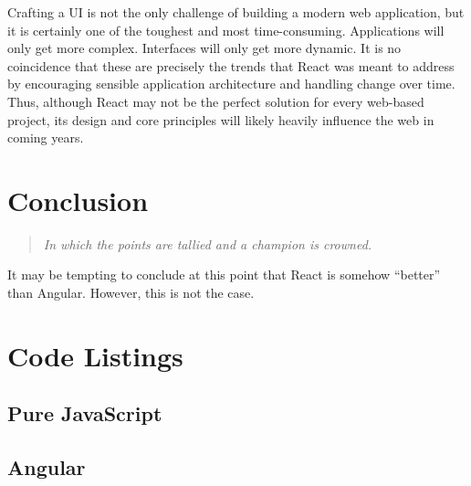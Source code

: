 \documentclass[12pt,letterpaper]{article}
\begin{document}
Crafting a UI is not the only challenge of building a modern web application, but it is certainly one of the toughest and most time-consuming. Applications will only get more complex. Interfaces will only get more dynamic. It is no coincidence that these are precisely the trends that React was meant to address by encouraging sensible application architecture and handling change over time. Thus, although React may not be the perfect solution for every web-based project, its design and core principles will likely heavily influence the web in coming years.


\section{Conclusion}
\vspace{-12pt}

\begin{quote}
	\singlespacing
	\emph{In which the points are tallied and a champion is crowned.}
\end{quote}

It may be tempting to conclude at this point that React is somehow ``better'' than Angular. However, this is not the case.











\newpage

\appendix
\section{Code Listings}
\label{app:code}

\subsection*{Pure JavaScript}




\newpage

\subsection*{Angular}
\end{document}
